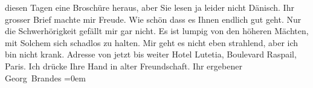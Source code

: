 \begin{ledgroupsized}[t]{13cm}
                    diesen Tagen eine Broschüre
                    heraus, aber Sie lesen ja leider nicht Dänisch.\pend
           \pstart
           Ihr grosser Brief machte mir Freude. Wie schön dass es Ihnen endlich gut geht.
                    Nur die Schwerhörigkeit gefällt mir gar nicht. Es ist lumpig von den höheren
                    Mächten, mit Solchem sich schadlos zu halten.\pend
           \pstart
           Mir geht es nicht eben strahlend, aber ich bin nicht krank. Adresse von jetzt bis
                    weiter Hotel Lutetia, Boulevard Raspail, Paris.\pend
           \pstart
           Ich drücke Ihre Hand in alter Freundschaft.\pend
           \pstart
           Ihr ergebener{\\[\baselineskip]}\spacefill\mbox{Georg Brandes}\pend
           \leftskip=0em{}          \endnumbering{}\end{ledgroupsized}  \newcommand{\dateiname}{L02016}\newcommand{\titel}{Georg Brandes an Arthur Schnitzler, 11. 4. 1911}\newcommand{\editorInnen}{Martin Anton Müller und Gerd-Hermann Susen}
            \footnotesize
\begin{ledgroupsized}[t]{11.5cm}
\end{ledgroupsized}
         
      
